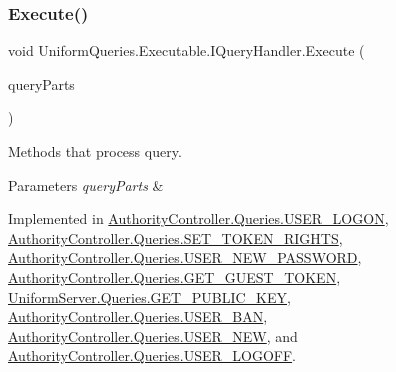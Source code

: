 \mbox{\label{interface_uniform_queries_1_1_executable_1_1_i_query_handler_a3268d72c0388f5e3debba4d73bdfe523}} 
\subsubsection{\texorpdfstring{Execute()}{Execute()}}
{\footnotesize\ttfamily void Uniform\+Queries.\+Executable.\+I\+Query\+Handler.\+Execute (\begin{DoxyParamCaption}\item[{\mbox{\hyperlink{struct_uniform_queries_1_1_query_part}{Query\+Part}} \mbox{[}$\,$\mbox{]}}]{query\+Parts }\end{DoxyParamCaption})}



Methods that process query. 


\begin{DoxyParams}{Parameters}
{\em query\+Parts} & \\
\hline
\end{DoxyParams}


Implemented in \mbox{\hyperlink{class_authority_controller_1_1_queries_1_1_u_s_e_r___l_o_g_o_n_a001f81c71597259636be777078e50f7e}{Authority\+Controller.\+Queries.\+U\+S\+E\+R\+\_\+\+L\+O\+G\+ON}}, \mbox{\hyperlink{class_authority_controller_1_1_queries_1_1_s_e_t___t_o_k_e_n___r_i_g_h_t_s_aebb323c8033e3a027f59c55a95695360}{Authority\+Controller.\+Queries.\+S\+E\+T\+\_\+\+T\+O\+K\+E\+N\+\_\+\+R\+I\+G\+H\+TS}}, \mbox{\hyperlink{class_authority_controller_1_1_queries_1_1_u_s_e_r___n_e_w___p_a_s_s_w_o_r_d_a63a5424c90f45f09f72a530ef0389416}{Authority\+Controller.\+Queries.\+U\+S\+E\+R\+\_\+\+N\+E\+W\+\_\+\+P\+A\+S\+S\+W\+O\+RD}}, \mbox{\hyperlink{class_authority_controller_1_1_queries_1_1_g_e_t___g_u_e_s_t___t_o_k_e_n_a99b0dddf4ff45771e546ec0fa14b0aae}{Authority\+Controller.\+Queries.\+G\+E\+T\+\_\+\+G\+U\+E\+S\+T\+\_\+\+T\+O\+K\+EN}}, \mbox{\hyperlink{class_uniform_server_1_1_queries_1_1_g_e_t___p_u_b_l_i_c___k_e_y_a63367fa9543a3fb4a1126373a833c317}{Uniform\+Server.\+Queries.\+G\+E\+T\+\_\+\+P\+U\+B\+L\+I\+C\+\_\+\+K\+EY}}, \mbox{\hyperlink{class_authority_controller_1_1_queries_1_1_u_s_e_r___b_a_n_a719795c950c9dedbc187c2c0cfca37a7}{Authority\+Controller.\+Queries.\+U\+S\+E\+R\+\_\+\+B\+AN}}, \mbox{\hyperlink{class_authority_controller_1_1_queries_1_1_u_s_e_r___n_e_w_afd715fb3d60e53ca7e3d55a4433f529c}{Authority\+Controller.\+Queries.\+U\+S\+E\+R\+\_\+\+N\+EW}}, and \mbox{\hyperlink{class_authority_controller_1_1_queries_1_1_u_s_e_r___l_o_g_o_f_f_a2e4d5a0f8ee93210522c41a38adbcce2}{Authority\+Controller.\+Queries.\+U\+S\+E\+R\+\_\+\+L\+O\+G\+O\+FF}}.

